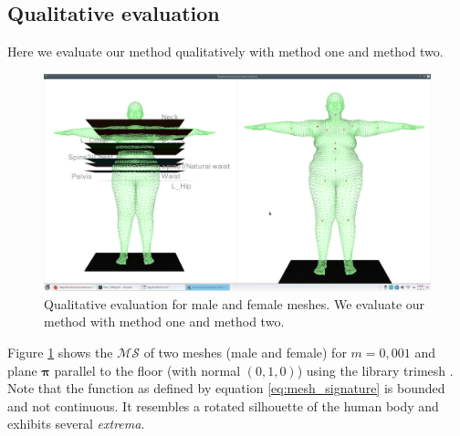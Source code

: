 \documentclass[runningheads, orivec]{llncs}
\begin{document}
\subsection{Qualitative evaluation}\label{subsec:qualitative_eval}
Here we evaluate our method qualitatively with method one and method two.
\begin{figure}[H]
	\begin{center}
		\includegraphics[width=\linewidth]{subject_6_with_cutting_planes_on_joints.eps}
	\end{center}
	\caption{Qualitative evaluation for male and female meshes. We evaluate our 
	method with method one and method two.}
	\label{fig:qualitative_eval}
\end{figure}

Figure \ref{fig:qualitative_eval} shows the $\mathcal{MS}$ of two meshes (male 
and female) for 
$m=0,001$ and plane $\boldsymbol{\pi}$ parallel to the floor (with normal $(0, 
1,0)$) using the library trimesh \cite{trimesh}. Note that the function as 
defined by equation \ref{eq:mesh_signature} is bounded and not continuous. It 
resembles a rotated silhouette of the human body and exhibits several 
\textit{extrema}.
\end{document}
